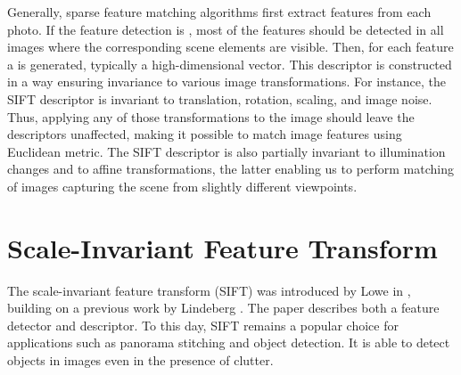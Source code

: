 Generally, sparse feature matching algorithms first extract features from each photo. %
If the feature detection is , most of the features should be detected in all images where the corresponding scene elements are visible.
Then, for each feature a  is generated, typically a high-dimensional vector. 
This descriptor is constructed in a way ensuring invariance to various image transformations. 
For instance, the SIFT descriptor is invariant to translation, rotation, scaling, and image noise. 
Thus, applying any of those transformations to the image should leave the descriptors unaffected, making it possible to match image features using Euclidean metric. 
The SIFT descriptor is also partially invariant to illumination changes and to affine transformations, the latter enabling us to perform matching of images capturing the scene from slightly different viewpoints.
 
\section{Scale-Invariant Feature Transform}
\label{sec:sift}

The scale-invariant feature transform (SIFT) was introduced by Lowe in \cite{lowe1999}, building on a previous work by Lindeberg \cite{lindeberg1998}. 
The paper describes both a feature detector and descriptor. 
To this day, SIFT remains a popular choice for applications such as panorama stitching and object detection. 
It is able to detect objects in images even in the presence of clutter.

